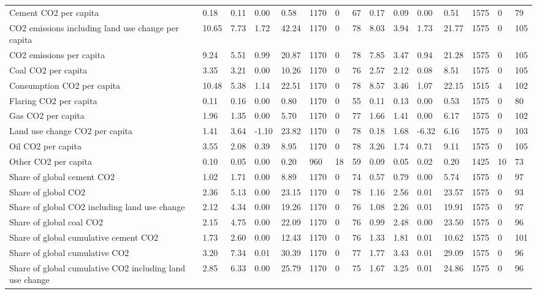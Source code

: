 \begin{longtable}{lllllllllllllll}
Cement CO2 per capita & 0.18 & 0.11 & 0.00 & 0.58 & 1170 & 0 & 67 & 0.17 & 0.09 & 0.00 & 0.51 & 1575 & 0 & 79\\
CO2 emissions including land use change per capita & 10.65 & 7.73 & 1.72 & 42.24 & 1170 & 0 & 78 & 8.03 & 3.94 & 1.73 & 21.77 & 1575 & 0 & 105\\
CO2 emissions per capita & 9.24 & 5.51 & 0.99 & 20.87 & 1170 & 0 & 78 & 7.85 & 3.47 & 0.94 & 21.28 & 1575 & 0 & 105\\
Coal CO2 per capita & 3.35 & 3.21 & 0.00 & 10.26 & 1170 & 0 & 76 & 2.57 & 2.12 & 0.08 & 8.51 & 1575 & 0 & 105\\
\addlinespace
Consumption CO2 per capita & 10.48 & 5.38 & 1.14 & 22.51 & 1170 & 0 & 78 & 8.57 & 3.46 & 1.07 & 22.15 & 1515 & 4 & 102\\
Flaring CO2 per capita & 0.11 & 0.16 & 0.00 & 0.80 & 1170 & 0 & 55 & 0.11 & 0.13 & 0.00 & 0.53 & 1575 & 0 & 80\\
Gas CO2 per capita & 1.96 & 1.35 & 0.00 & 5.70 & 1170 & 0 & 77 & 1.66 & 1.41 & 0.00 & 6.17 & 1575 & 0 & 102\\
Land use change CO2 per capita & 1.41 & 3.64 & -1.10 & 23.82 & 1170 & 0 & 78 & 0.18 & 1.68 & -6.32 & 6.16 & 1575 & 0 & 103\\
Oil CO2 per capita & 3.55 & 2.08 & 0.39 & 8.95 & 1170 & 0 & 78 & 3.26 & 1.74 & 0.71 & 9.11 & 1575 & 0 & 105\\
\addlinespace
Other CO2 per capita & 0.10 & 0.05 & 0.00 & 0.20 & 960 & 18 & 59 & 0.09 & 0.05 & 0.02 & 0.20 & 1425 & 10 & 73\\
Share of global cement CO2 & 1.02 & 1.71 & 0.00 & 8.89 & 1170 & 0 & 74 & 0.57 & 0.79 & 0.00 & 5.74 & 1575 & 0 & 97\\
Share of global CO2 & 2.36 & 5.13 & 0.00 & 23.15 & 1170 & 0 & 78 & 1.16 & 2.56 & 0.01 & 23.57 & 1575 & 0 & 93\\
Share of global CO2 including land use change & 2.12 & 4.34 & 0.00 & 19.26 & 1170 & 0 & 76 & 1.08 & 2.26 & 0.01 & 19.91 & 1575 & 0 & 97\\
Share of global coal CO2 & 2.15 & 4.75 & 0.00 & 22.09 & 1170 & 0 & 76 & 0.99 & 2.48 & 0.00 & 23.50 & 1575 & 0 & 96\\
\addlinespace
Share of global cumulative cement CO2 & 1.73 & 2.60 & 0.00 & 12.43 & 1170 & 0 & 76 & 1.33 & 1.81 & 0.01 & 10.62 & 1575 & 0 & 101\\
Share of global cumulative CO2 & 3.20 & 7.34 & 0.01 & 30.39 & 1170 & 0 & 77 & 1.77 & 3.43 & 0.01 & 29.09 & 1575 & 0 & 96\\
Share of global cumulative CO2 including land use change & 2.85 & 6.33 & 0.00 & 25.79 & 1170 & 0 & 75 & 1.67 & 3.25 & 0.01 & 24.86 & 1575 & 0 & 96\\

\end{longtable}
